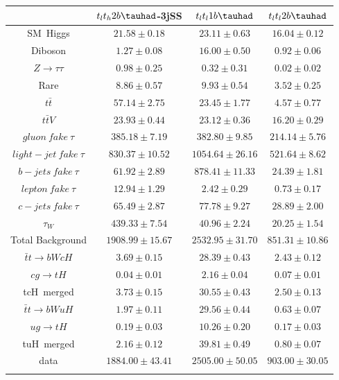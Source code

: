 \centering
\begin{tabular}{cccc} \toprule\toprule
 & $t_lt_h2b\tauhad$-3jSS & $t_lt_l1b\tauhad$ & $t_lt_l2b\tauhad$\\\midrule
SM~Higgs & $21.58\pm0.18$ & $23.11\pm0.63$ & $16.04\pm0.12$\\
Diboson & $1.27\pm0.08$ & $16.00\pm0.50$ & $0.92\pm0.06$\\
$Z\to\tau\tau$ & $0.98\pm0.25$ & $0.32\pm0.31$ & $0.02\pm0.02$\\
Rare & $8.86\pm0.57$ & $9.93\pm0.54$ & $3.52\pm0.25$\\
$t\bar{t}$ & $57.14\pm2.75$ & $23.45\pm1.77$ & $4.57\pm0.77$\\
$t\bar{t}V$ & $23.93\pm0.44$ & $23.12\pm0.36$ & $16.20\pm0.29$\\
$gluon~fake~\tau$ & $385.18\pm7.19$ & $382.80\pm9.85$ & $214.14\pm5.76$\\
$light-jet~fake~\tau$ & $830.37\pm10.52$ & $1054.64\pm26.16$ & $521.64\pm8.62$\\
$b-jets~fake~\tau$ & $61.92\pm2.89$ & $878.41\pm11.33$ & $24.39\pm1.81$\\
$lepton~fake~\tau$ & $12.94\pm1.29$ & $2.42\pm0.29$ & $0.73\pm0.17$\\
$c-jets~fake~\tau$ & $65.49\pm2.87$ & $77.78\pm9.27$ & $28.89\pm2.00$\\
$\tau_{W}$ & $439.33\pm7.54$ & $40.96\pm2.24$ & $20.25\pm1.54$\\\midrule
Total Background & $1908.99\pm15.67$ & $2532.95\pm31.70$ & $851.31\pm10.86$\\\midrule\midrule
$\bar{t}t\to bWcH$ & $3.69\pm0.15$ & $28.39\pm0.43$ & $2.43\pm0.12$\\
$cg\to tH$ & $0.04\pm0.01$ & $2.16\pm0.04$ & $0.07\pm0.01$\\
tcH~merged & $3.73\pm0.15$ & $30.55\pm0.43$ & $2.50\pm0.13$\\\midrule
$\bar{t}t\to bWuH$ & $1.97\pm0.11$ & $29.56\pm0.44$ & $0.63\pm0.07$\\
$ug\to tH$ & $0.19\pm0.03$ & $10.26\pm0.20$ & $0.17\pm0.03$\\
tuH~merged & $2.16\pm0.12$ & $39.81\pm0.49$ & $0.80\pm0.07$\\\midrule\midrule
data & $1884.00\pm43.41$ & $2505.00\pm50.05$ & $903.00\pm30.05$\\
\bottomrule\bottomrule\\
\end{tabular}

